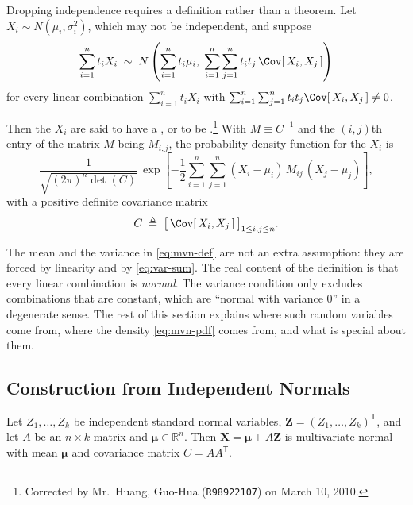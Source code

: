Dropping independence requires a definition rather than a theorem.
Let $X_{i}\sim N(\mu_{i},\sigma_{i}^{2})$, which may not be independent, and suppose
\begin{equation}
	\sum_{i=1}^{n} t_{i}X_{i} \;\sim\;
	N\left(\sum_{i=1}^{n} t_{i}\mu_{i},\;
	\sum_{i=1}^{n}\sum_{j=1}^{n} t_{i}t_{j}\,\Cov[\,X_{i},X_{j}\,]\right) \label{eq:mvn-def}
\end{equation}
for every linear combination $\sum_{i=1}^{n}t_{i}X_{i}$ with $\sum_{i=1}^{n}\sum_{j=1}^{n}t_{i}t_{j}\Cov[\,X_{i},X_{j}\,]\neq 0$.


Then the $X_{i}$ are said to have a , or to be .\footnote{Corrected by Mr.~Huang, Guo-Hua (\texttt{R98922107}) on March 10, 2010.}
With $M\equiv C^{-1}$ and the $(i,j)$th entry of the matrix $M$ being $M_{i,j}$, the probability density function for the $X_{i}$ is
\begin{equation}
	\frac{1}{\sqrt{(2\pi)^{n}\det(C)}}\,
	\exp\left[-\frac{1}{2}\sum_{i=1}^{n}\sum_{j=1}^{n}(X_{i}-\mu_{i})\,M_{ij}\,(X_{j}-\mu_{j})\right] , \label{eq:mvn-pdf}
\end{equation}
with a positive definite covariance matrix
\[
	C \;\triangleq\; \bigl[\,\Cov[\,X_{i},X_{j}\,]\,\bigr]_{1\le i,j\le n} .
\]

\suppstart
The mean and the variance in \eqref{eq:mvn-def} are not an extra assumption: they are forced by linearity and by \eqref{eq:var-sum}.
The real content of the definition is that every linear combination is \emph{normal}.
The variance condition only excludes combinations that are constant, which are ``normal with variance $0$'' in a degenerate sense.
The rest of this section explains where such random variables come from, where the density \eqref{eq:mvn-pdf} comes from, and what is special about them.

\subsection{Construction from Independent Normals}

\begin{proposition}\label{prop:mvn-construct}
	Let $Z_{1},\dots,Z_{k}$ be independent standard normal variables, $\bm{Z}=(Z_{1},\dots,Z_{k})^{\mathsf{T}}$, and let $A$ be an $n\times k$ matrix and $\bm{\mu}\in\mathbb{R}^{n}$.
	Then $\bm{X}=\bm{\mu}+A\bm{Z}$ is multivariate normal with mean $\bm{\mu}$ and covariance matrix $C=AA^{\mathsf{T}}$.
\end{proposition}

